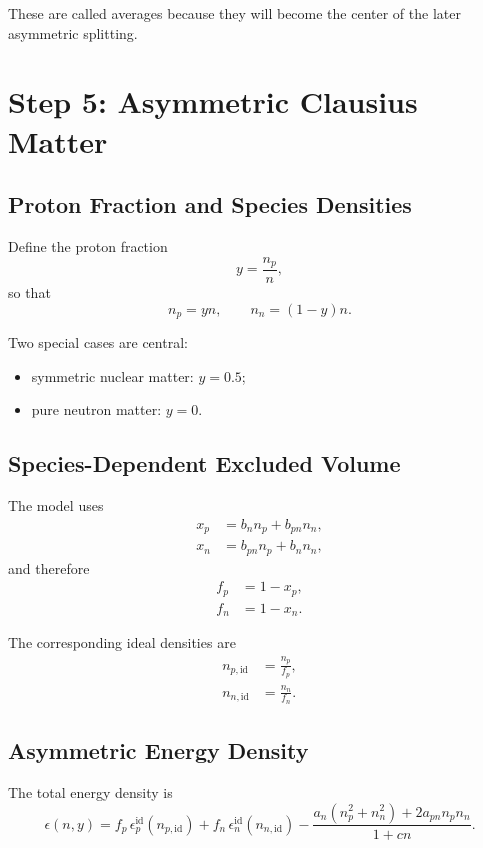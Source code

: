 \documentclass[11pt]{article}
\begin{document}
These are called averages because they will become the center of the later
asymmetric splitting.

\section{Step 5: Asymmetric Clausius Matter}

\subsection{Proton Fraction and Species Densities}

Define the proton fraction
\begin{equation}
y=\frac{n_p}{n},
\end{equation}
so that
\begin{equation}
n_p=yn,\qquad n_n=(1-y)n.
\end{equation}

Two special cases are central:
\begin{itemize}
\item symmetric nuclear matter: $y=0.5$;
\item pure neutron matter: $y=0$.
\end{itemize}

\subsection{Species-Dependent Excluded Volume}

The model uses
\begin{align}
x_p &= b_n n_p + b_{pn} n_n, \\
x_n &= b_{pn} n_p + b_n n_n,
\end{align}
and therefore
\begin{align}
f_p &= 1-x_p, \\
f_n &= 1-x_n.
\end{align}

The corresponding ideal densities are
\begin{align}
n_{p,\mathrm{id}} &= \frac{n_p}{f_p}, \\
n_{n,\mathrm{id}} &= \frac{n_n}{f_n}.
\end{align}

\subsection{Asymmetric Energy Density}

The total energy density is
\begin{equation}
\epsilon(n,y)
=
f_p\,\epsilon_p^{\mathrm{id}}(n_{p,\mathrm{id}})
+
f_n\,\epsilon_n^{\mathrm{id}}(n_{n,\mathrm{id}})
-\frac{a_n(n_p^2+n_n^2)+2a_{pn}n_pn_n}{1+cn}.
\end{equation}
\end{document}
